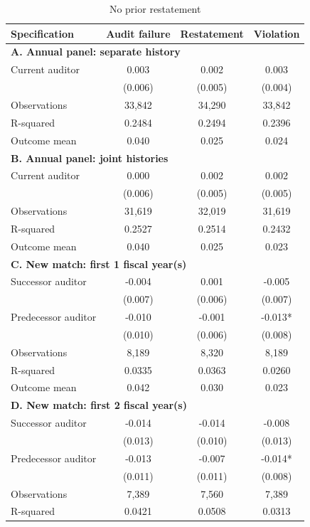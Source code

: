 \begin{table}[htbp]
\footnotesize
\centering
\caption{No prior restatement}
\begin{threeparttable}
\begin{tabular}{p{}ccc}
\toprule
Specification & Audit failure & Restatement & Violation \\
\midrule
\multicolumn{4}{l}{\textbf{A. Annual panel: separate history}} \\
Current auditor & 0.003 & 0.002 & 0.003 \\
 & (0.006) & (0.005) & (0.004) \\
Observations & 33,842 & 34,290 & 33,842 \\
R-squared & 0.2484 & 0.2494 & 0.2396 \\
Outcome mean & 0.040 & 0.025 & 0.024 \\
\multicolumn{4}{l}{\textbf{B. Annual panel: joint histories}} \\
Current auditor & 0.000 & 0.002 & 0.002 \\
 & (0.006) & (0.005) & (0.005) \\
Observations & 31,619 & 32,019 & 31,619 \\
R-squared & 0.2527 & 0.2514 & 0.2432 \\
Outcome mean & 0.040 & 0.025 & 0.023 \\
\multicolumn{4}{l}{\textbf{C. New match: first 1 fiscal year(s)}} \\
Successor auditor & -0.004 & 0.001 & -0.005 \\
 & (0.007) & (0.006) & (0.007) \\
Predecessor auditor & -0.010 & -0.001 & -0.013* \\
 & (0.010) & (0.006) & (0.008) \\
Observations & 8,189 & 8,320 & 8,189 \\
R-squared & 0.0335 & 0.0363 & 0.0260 \\
Outcome mean & 0.042 & 0.030 & 0.023 \\
\multicolumn{4}{l}{\textbf{D. New match: first 2 fiscal year(s)}} \\
Successor auditor & -0.014 & -0.014 & -0.008 \\
 & (0.013) & (0.010) & (0.013) \\
Predecessor auditor & -0.013 & -0.007 & -0.014* \\
 & (0.011) & (0.011) & (0.008) \\
Observations & 7,389 & 7,560 & 7,389 \\
R-squared & 0.0421 & 0.0508 & 0.0313 \\

\end{tabular}
\end{threeparttable}
\end{table}
